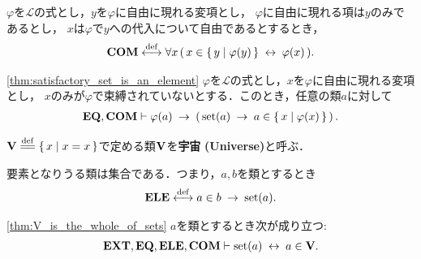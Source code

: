 	\begin{screen}
		\begin{axm}[内包性公理] 
			$\varphi$を$\mathcal{L}$の式とし，$y$を$\varphi$に自由に現れる変項とし，
			$\varphi$に自由に現れる項は$y$のみであるとし，
			$x$は$\varphi$で$y$への代入について自由であるとするとき，
			\begin{align}
				\mbox{\bf COM} \overset{\mathrm{def}}{\longleftrightarrow} \forall x\, (\, x \in \left\{\, y \mid \varphi(y)\, \right\} \hspace{0.25em}\leftrightarrow\hspace{0.25em} \varphi(x)\, ).
			\end{align}
		\end{axm}
	\end{screen}
	
	\begin{screen}
		\begin{thm}[条件を満たす集合は要素である]\ref{thm:satisfactory_set_is_an_element}
			$\varphi$を$\mathcal{L}$の式とし，$x$を$\varphi$に自由に現れる変項とし，
			$x$のみが$\varphi$で束縛されていないとする．このとき，任意の類$a$に対して
			\begin{align}
				\mbox{{\bf EQ}},\mbox{\bf COM} \vdash \varphi(a) \hspace{0.25em}\rightarrow\hspace{0.25em} 
				\left(\, \operatorname*{set} (a) \hspace{0.25em}\rightarrow\hspace{0.25em} a \in \left\{\, x \mid \varphi(x)\, \right\}\, \right).
			\end{align}
		\end{thm}
	\end{screen}
	
	\begin{screen}
		\begin{dfn}[宇宙]
			$\Univ \defeq \Set{x}{x=x}$で定める類$\mathbf{V}$を{\bf 宇宙}\index{うちゅう@宇宙}
			{\bf (Universe)}と呼ぶ．
		\end{dfn}
	\end{screen}
	
	\begin{screen}
		\begin{axm}[要素の公理]
			要素となりうる類は集合である．つまり，$a,b$を類とするとき
			\begin{align}
				\mbox{{\bf ELE}} \overset{\mathrm{def}}{\longleftrightarrow} a \in b \hspace{0.25em}\rightarrow\hspace{0.25em} \operatorname*{set} (a).
			\end{align}
		\end{axm}
	\end{screen}
	
	\begin{screen}
		\begin{thm}
		\ref{thm:V_is_the_whole_of_sets}
			$a$を類とするとき次が成り立つ:
			\begin{align}
				\mbox{{\bf EXT}},\mbox{{\bf EQ}},\mbox{{\bf ELE}},\mbox{\bf COM} \vdash \operatorname*{set} (a) \hspace{0.25em}\leftrightarrow\hspace{0.25em} a \in \mathbf{V}.
			\end{align}
		\end{thm}
	\end{screen}
	

